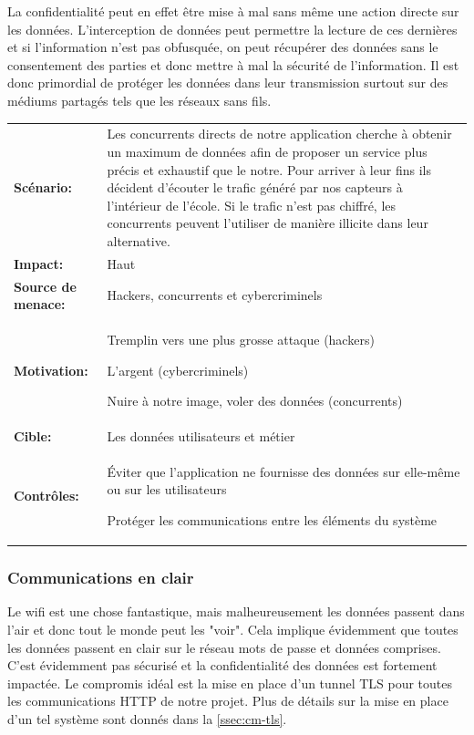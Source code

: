 \documentclass[12pt]{article}
\begin{document}
La confidentialité peut en effet être mise à mal sans même une action directe sur les données. L'interception de données peut permettre la lecture de ces dernières et si l'information n'est pas obfusquée, on peut récupérer des données sans le consentement des parties et donc mettre à mal la sécurité de l'information. Il est donc primordial de protéger les données dans leur transmission surtout sur des médiums partagés tels que les réseaux sans fils.
\medskip

\renewcommand{\arraystretch}{1.6}
\begin{tabular}{@{}p{4cm}p{12cm}}
\textbf{Scénario:} &  Les concurrents directs de notre application cherche à obtenir un maximum de données afin de proposer un service plus précis et exhaustif que le notre. Pour arriver à leur fins ils décident d'écouter le trafic généré par nos capteurs à l'intérieur de l'école. Si le trafic n'est pas chiffré, les concurrents peuvent l'utiliser de manière illicite dans leur alternative.\\
\textbf{Impact:} & Haut \\
\textbf{Source de menace: } & Hackers, concurrents et cybercriminels \\
\textbf{Motivation:} & Tremplin vers une plus grosse attaque (hackers)

L'argent (cybercriminels)

Nuire à notre image, voler des données (concurrents)\\
\textbf{Cible:} & Les données utilisateurs et métier \\
\textbf{Contrôles:} & Éviter que l'application ne fournisse des données sur elle-même ou sur les utilisateurs

Protéger les communications entre les éléments du système
\end{tabular}
\renewcommand{\arraystretch}{1}

\subsubsection{Communications en clair}

Le wifi est une chose fantastique, mais malheureusement les données passent dans l'air et donc tout le monde peut les "voir". Cela implique évidemment que toutes les données passent en clair sur le réseau mots de passe et données comprises. C'est évidemment pas sécurisé et la confidentialité des données est fortement impactée. Le compromis idéal est la mise en place d'un tunnel TLS pour toutes les communications HTTP de notre projet. Plus de détails sur la mise en place d'un tel système sont donnés dans la \autoref{ssec:cm-tls}.
\end{document}
